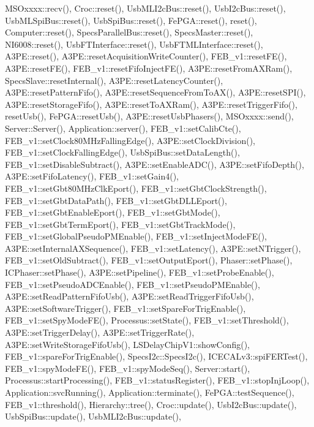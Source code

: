 M\+S\+Oxxxx\+::recv(), Croc\+::reset(), Usb\+M\+L\+I2c\+Bus\+::reset(), Usb\+I2c\+Bus\+::reset(), Usb\+M\+L\+Spi\+Bus\+::reset(), Usb\+Spi\+Bus\+::reset(), Fe\+P\+G\+A\+::reset(), reset(), Computer\+::reset(), Specs\+Parallel\+Bus\+::reset(), Specs\+Master\+::reset(), N\+I6008\+::reset(), Usb\+F\+T\+Interface\+::reset(), Usb\+F\+T\+M\+L\+Interface\+::reset(), A3\+P\+E\+::reset(), A3\+P\+E\+::reset\+Acquisition\+Write\+Counter(), F\+E\+B\+\_\+v1\+::reset\+F\+E(), A3\+P\+E\+::reset\+F\+E(), F\+E\+B\+\_\+v1\+::reset\+Fifo\+Inject\+F\+E(), A3\+P\+E\+::reset\+From\+A\+X\+Ram(), Specs\+Slave\+::reset\+Internal(), A3\+P\+E\+::reset\+Latency\+Counter(), A3\+P\+E\+::reset\+Pattern\+Fifo(), A3\+P\+E\+::reset\+Sequence\+From\+To\+A\+X(), A3\+P\+E\+::reset\+S\+P\+I(), A3\+P\+E\+::reset\+Storage\+Fifo(), A3\+P\+E\+::reset\+To\+A\+X\+Ram(), A3\+P\+E\+::reset\+Trigger\+Fifo(), reset\+Usb(), Fe\+P\+G\+A\+::reset\+Usb(), A3\+P\+E\+::reset\+Usb\+Phasers(), M\+S\+Oxxxx\+::send(), Server\+::\+Server(), Application\+::server(), F\+E\+B\+\_\+v1\+::set\+Calib\+Cte(), F\+E\+B\+\_\+v1\+::set\+Clock80\+M\+Hz\+Falling\+Edge(), A3\+P\+E\+::set\+Clock\+Division(), F\+E\+B\+\_\+v1\+::set\+Clock\+Falling\+Edge(), Usb\+Spi\+Bus\+::set\+Data\+Length(), F\+E\+B\+\_\+v1\+::set\+Disable\+Subtract(), A3\+P\+E\+::set\+Enable\+A\+D\+C(), A3\+P\+E\+::set\+Fifo\+Depth(), A3\+P\+E\+::set\+Fifo\+Latency(), F\+E\+B\+\_\+v1\+::set\+Gain4(), F\+E\+B\+\_\+v1\+::set\+Gbt80\+M\+Hz\+Clk\+Eport(), F\+E\+B\+\_\+v1\+::set\+Gbt\+Clock\+Strength(), F\+E\+B\+\_\+v1\+::set\+Gbt\+Data\+Path(), F\+E\+B\+\_\+v1\+::set\+Gbt\+D\+L\+L\+Eport(), F\+E\+B\+\_\+v1\+::set\+Gbt\+Enable\+Eport(), F\+E\+B\+\_\+v1\+::set\+Gbt\+Mode(), F\+E\+B\+\_\+v1\+::set\+Gbt\+Term\+Eport(), F\+E\+B\+\_\+v1\+::set\+Gbt\+Track\+Mode(), F\+E\+B\+\_\+v1\+::set\+Global\+Pseudo\+P\+M\+Enable(), F\+E\+B\+\_\+v1\+::set\+Inject\+Mode\+F\+E(), A3\+P\+E\+::set\+Internal\+A\+X\+Sequence(), F\+E\+B\+\_\+v1\+::set\+Latency(), A3\+P\+E\+::set\+N\+Trigger(), F\+E\+B\+\_\+v1\+::set\+Old\+Subtract(), F\+E\+B\+\_\+v1\+::set\+Output\+Eport(), Phaser\+::set\+Phase(), I\+C\+Phaser\+::set\+Phase(), A3\+P\+E\+::set\+Pipeline(), F\+E\+B\+\_\+v1\+::set\+Probe\+Enable(), F\+E\+B\+\_\+v1\+::set\+Pseudo\+A\+D\+C\+Enable(), F\+E\+B\+\_\+v1\+::set\+Pseudo\+P\+M\+Enable(), A3\+P\+E\+::set\+Read\+Pattern\+Fifo\+Usb(), A3\+P\+E\+::set\+Read\+Trigger\+Fifo\+Usb(), A3\+P\+E\+::set\+Software\+Trigger(), F\+E\+B\+\_\+v1\+::set\+Spare\+For\+Trig\+Enable(), F\+E\+B\+\_\+v1\+::set\+Spy\+Mode\+F\+E(), Processus\+::set\+State(), F\+E\+B\+\_\+v1\+::set\+Threshold(), A3\+P\+E\+::set\+Trigger\+Delay(), A3\+P\+E\+::set\+Trigger\+Rate(), A3\+P\+E\+::set\+Write\+Storage\+Fifo\+Usb(), L\+S\+Delay\+Chip\+V1\+::show\+Config(), F\+E\+B\+\_\+v1\+::spare\+For\+Trig\+Enable(), Specs\+I2c\+::\+Specs\+I2c(), I\+C\+E\+C\+A\+Lv3\+::spi\+F\+E\+R\+Test(), F\+E\+B\+\_\+v1\+::spy\+Mode\+F\+E(), F\+E\+B\+\_\+v1\+::spy\+Mode\+Seq(), Server\+::start(), Processus\+::start\+Processing(), F\+E\+B\+\_\+v1\+::status\+Register(), F\+E\+B\+\_\+v1\+::stop\+Inj\+Loop(), Application\+::svc\+Running(), Application\+::terminate(), Fe\+P\+G\+A\+::test\+Sequence(), F\+E\+B\+\_\+v1\+::threshold(), Hierarchy\+::tree(), Croc\+::update(), Usb\+I2c\+Bus\+::update(), Usb\+Spi\+Bus\+::update(), Usb\+M\+L\+I2c\+Bus\+::update(), 